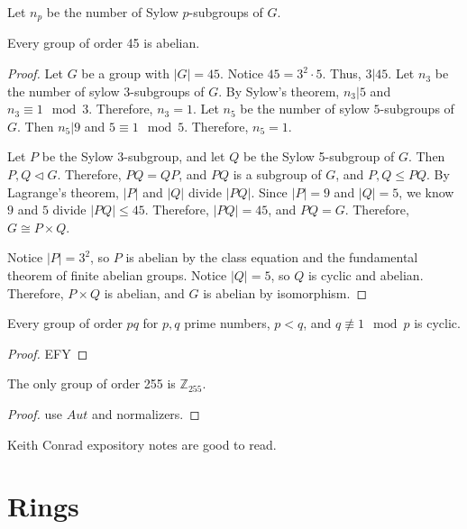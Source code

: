 \begin{notation}
	Let $n_p$ be the number of Sylow $p$-subgroups of $G$.
\end{notation}
\begin{theorem}\label{thm:JHS}
	Every group of order 45 is abelian.
\end{theorem}
\begin{proof}
	Let $G$ be a group with $\left| G \right| =45$. Notice $45=3^2\cdot 5$. Thus,  $3|45$. Let $n_3$ be the number of sylow $3$-subgroups of $G$. By Sylow's theorem, $n_3|5$ and $n_3\equiv 1\mod{3}$. Therefore, $n_3=1$. Let $n_5$ be the number of sylow $5$-subgroups of $G$. Then $n_5|9$ and $5\equiv 1\mod{5}$. Therefore, $n_5=1$.

	Let $P$ be the Sylow $3 $-subgroup, and let $Q$ be the Sylow 5-subgroup of $G$. Then $P,Q\triangleleft G$. Therefore, $PQ=QP$, and $PQ$ is a subgroup of $G$, and $P,Q\leq PQ$. By Lagrange's theorem, $\left| P \right| $ and $\left| Q \right| $ divide $\left| PQ \right| $. Since $\left| P \right| =9$ and $\left| Q \right| =5$, we know $9$ and $5$ divide $\left| PQ \right| \leq 45$. Therefore, $\left| PQ \right| =45$, and $PQ=G$. Therefore, $G\cong P\times Q$.

	Notice $\left| P \right| =3^2$, so $P$ is abelian by the class equation and the fundamental theorem of finite abelian groups. Notice $\left| Q \right| =5$, so $Q$ is cyclic and abelian. Therefore, $P\times Q$ is abelian, and $G$ is abelian by isomorphism.
\end{proof}
\begin{theorem}\label{thm:aksh}
	Every group of order $pq$ for $p,q$ prime numbers, $p<q$, and $q\not\equiv 1\mod{p}$ is cyclic.
\end{theorem}
\begin{proof}
	EFY
\end{proof}
\begin{theorem}\label{thm:hsgdbjs}
	The only group of order 255 is $\mathbb{Z}_{255}$.
\end{theorem}
\begin{proof}
	use $Aut$ and normalizers.
\end{proof}
\begin{remark}
	Keith Conrad expository notes are good to read.
\end{remark}
\chapter{Rings}

